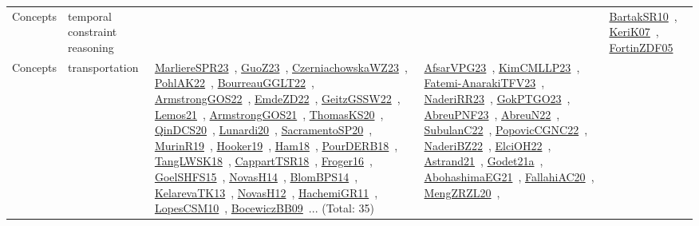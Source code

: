 {\begin{longtable}{lp{3cm}>{\raggedright\arraybackslash}p{6cm}>{\raggedright\arraybackslash}p{6cm}>{\raggedright\arraybackslash}p{8cm}}
Concepts & temporal constraint reasoning &  &  & \href{../works/BartakSR10.pdf}{BartakSR10}~\cite{BartakSR10}, \href{../works/KeriK07.pdf}{KeriK07}~\cite{KeriK07}, \href{../works/FortinZDF05.pdf}{FortinZDF05}~\cite{FortinZDF05}\\
Concepts & transportation & \href{../works/MarliereSPR23.pdf}{MarliereSPR23}~\cite{MarliereSPR23}, \href{../works/GuoZ23.pdf}{GuoZ23}~\cite{GuoZ23}, \href{../works/CzerniachowskaWZ23.pdf}{CzerniachowskaWZ23}~\cite{CzerniachowskaWZ23}, \href{../works/PohlAK22.pdf}{PohlAK22}~\cite{PohlAK22}, \href{../works/BourreauGGLT22.pdf}{BourreauGGLT22}~\cite{BourreauGGLT22}, \href{../works/ArmstrongGOS22.pdf}{ArmstrongGOS22}~\cite{ArmstrongGOS22}, \href{../works/EmdeZD22.pdf}{EmdeZD22}~\cite{EmdeZD22}, \href{../works/GeitzGSSW22.pdf}{GeitzGSSW22}~\cite{GeitzGSSW22}, \href{../works/Lemos21.pdf}{Lemos21}~\cite{Lemos21}, \href{../works/ArmstrongGOS21.pdf}{ArmstrongGOS21}~\cite{ArmstrongGOS21}, \href{../works/ThomasKS20.pdf}{ThomasKS20}~\cite{ThomasKS20}, \href{../works/QinDCS20.pdf}{QinDCS20}~\cite{QinDCS20}, \href{../works/Lunardi20.pdf}{Lunardi20}~\cite{Lunardi20}, \href{../works/SacramentoSP20.pdf}{SacramentoSP20}~\cite{SacramentoSP20}, \href{../works/MurinR19.pdf}{MurinR19}~\cite{MurinR19}, \href{../works/Hooker19.pdf}{Hooker19}~\cite{Hooker19}, \href{../works/Ham18.pdf}{Ham18}~\cite{Ham18}, \href{../works/PourDERB18.pdf}{PourDERB18}~\cite{PourDERB18}, \href{../works/TangLWSK18.pdf}{TangLWSK18}~\cite{TangLWSK18}, \href{../works/CappartTSR18.pdf}{CappartTSR18}~\cite{CappartTSR18}, \href{../works/Froger16.pdf}{Froger16}~\cite{Froger16}, \href{../works/GoelSHFS15.pdf}{GoelSHFS15}~\cite{GoelSHFS15}, \href{../works/NovasH14.pdf}{NovasH14}~\cite{NovasH14}, \href{../works/BlomBPS14.pdf}{BlomBPS14}~\cite{BlomBPS14}, \href{../works/KelarevaTK13.pdf}{KelarevaTK13}~\cite{KelarevaTK13}, \href{../works/NovasH12.pdf}{NovasH12}~\cite{NovasH12}, \href{../works/HachemiGR11.pdf}{HachemiGR11}~\cite{HachemiGR11}, \href{../works/LopesCSM10.pdf}{LopesCSM10}~\cite{LopesCSM10}, \href{../works/BocewiczBB09.pdf}{BocewiczBB09}~\cite{BocewiczBB09}... (Total: 35) & \href{../works/AfsarVPG23.pdf}{AfsarVPG23}~\cite{AfsarVPG23}, \href{../works/KimCMLLP23.pdf}{KimCMLLP23}~\cite{KimCMLLP23}, \href{../works/Fatemi-AnarakiTFV23.pdf}{Fatemi-AnarakiTFV23}~\cite{Fatemi-AnarakiTFV23}, \href{../works/NaderiRR23.pdf}{NaderiRR23}~\cite{NaderiRR23}, \href{../works/GokPTGO23.pdf}{GokPTGO23}~\cite{GokPTGO23}, \href{../works/AbreuPNF23.pdf}{AbreuPNF23}~\cite{AbreuPNF23}, \href{../works/AbreuN22.pdf}{AbreuN22}~\cite{AbreuN22}, \href{../works/SubulanC22.pdf}{SubulanC22}~\cite{SubulanC22}, \href{../works/PopovicCGNC22.pdf}{PopovicCGNC22}~\cite{PopovicCGNC22}, \href{../works/NaderiBZ22.pdf}{NaderiBZ22}~\cite{NaderiBZ22}, \href{../works/ElciOH22.pdf}{ElciOH22}~\cite{ElciOH22}, \href{../works/Astrand21.pdf}{Astrand21}~\cite{Astrand21}, \href{../works/Godet21a.pdf}{Godet21a}~\cite{Godet21a}, \href{../works/AbohashimaEG21.pdf}{AbohashimaEG21}~\cite{AbohashimaEG21}, \href{../works/FallahiAC20.pdf}{FallahiAC20}~\cite{FallahiAC20}, \href{../works/MengZRZL20.pdf}{MengZRZL20}~\cite{MengZRZL20}, 
\end{longtable}}
